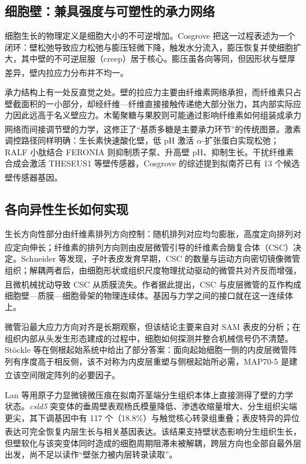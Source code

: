 \documentclass[11pt,a4paper]{ctexart}
\begin{document}
\subsection{细胞壁：兼具强度与可塑性的承力网络}

细胞生长的物理定义是细胞大小的不可逆增加。Cosgrove 把这一过程表述为一个闭环：壁松弛导致应力松弛与膨压轻微下降，触发水分流入，膨压恢复并使细胞扩大，其中壁的不可逆屈服（creep）居于核心。膨压虽各向等同，但因形状与壁厚差异，壁内拉应力分布并不均一\textsuperscript{\cite{ref4}}。

承力结构上有一处反直觉之处。壁的拉应力主要由纤维素网络承担，而纤维素只占壁截面积的一小部分，却经纤维—纤维直接接触传递绝大部分张力，其内部实际应力因此远高于名义壁应力。木葡聚糖与果胶则可能通过影响纤维素如何组装成承力网络而间接调节壁的力学，这修正了“基质多糖是主要承力环节”的传统图景\textsuperscript{\cite{ref4}}。激素调控路径同样明确：生长素快速酸化壁，低 pH 激活 $\alpha$-扩张蛋白实现松弛；RALF 小肽结合 FERONIA 则抑制质子泵、升高壁 pH、抑制生长。干扰纤维素合成会激活 THESEUS1 等壁传感器，Cosgrove 的综述提到拟南芥已有 13 个候选壁传感器基因\textsuperscript{\cite{ref4}}。

\subsection{各向异性生长如何实现}

生长方向性部分由纤维素排列方向控制：随机排列对应均匀膨胀，高度定向排列对应定向伸长\textsuperscript{\cite{ref4}}；纤维素的排列方向则由皮层微管引导的纤维素合酶复合体（CSC）决定。Schneider 等发现，子叶表皮发育早期，CSC 的数量与运动方向密切镜像微管组织；解耦两者后，由细胞形状或组织尺度物理扰动驱动的微管共对齐反而增强，且微机械扰动导致 CSC 从质膜流失\textsuperscript{\cite{ref14}}。作者据此提出，CSC 与皮层微管的互作构成细胞壁—质膜—细胞骨架的物理连续体。基因与力学之间的接口就在这一连续体上。

微管沿最大应力方向对齐是长期观察，但该结论主要来自对 SAM 表皮的分析；在组织内部从头发生形态建成的过程中，细胞如何探测并整合机械信号仍不清楚。Stöckle 等在侧根起始系统中给出了部分答案：面向起始细胞一侧的内皮层微管阵列有序度高于相反侧，该不对称为内皮层重塑与侧根起始所必需，MAP70-5 是建立该空间限定阵列的必要因子\textsuperscript{\cite{ref15}}。

Lan 等用原子力显微镜微压痕在拟南芥茎端分生组织本体上直接测得了壁的力学状态。\textit{csld5} 突变体的垂周壁表观杨氏模量降低、渗透收缩量增大、分生组织尖端更尖，其下调基因中有 117 个（18.8\%）与触觉核心转录组重叠；表皮特异的异位表达可完全恢复内层生长与相关基因表达\textsuperscript{\cite{ref16}}。该结果支持壁状态影响分生组织生长，但壁软化与该突变体同时造成的细胞周期阻滞未被解耦，跨层方向也全部自最外层出发，尚不足以读作“壁张力被内层转录读取”。
\end{document}
